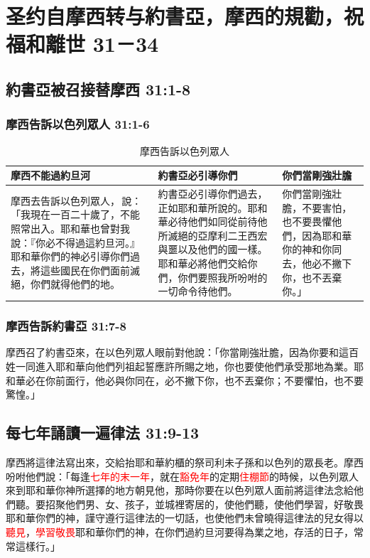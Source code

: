 \section{圣约自摩西转与約書亞，摩西的規勸，祝福和離世 31－34 }
\subsection{約書亞被召接替摩西 31:1-8 }
\subsubsection{摩西告訴以色列眾人 31:1-6}
\begin{table}[H]
\begin{center}
\begin{tabular}{ p{}|p{}|p{}} \toprule
摩西不能過約旦河&約書亞必引導你們&你們當剛強壯膽\\\hline
摩西去告訴以色列眾人， 說：「我現在一百二十歲了，不能照常出入。耶和華也曾對我說：『你必不得過這約旦河。』耶和華你們的神必引導你們過去，將這些國民在你們面前滅絕，你們就得他們的地。 
&約書亞必引導你們過去，正如耶和華所說的。耶和華必待他們如同從前待他所滅絕的亞摩利二王西宏與噩以及他們的國一樣。耶和華必將他們交給你們，你們要照我所吩咐的一切命令待他們。
&
你們當剛強壯膽，不要害怕，也不要畏懼他們，因為耶和華你的神和你同去，他必不撇下你，也不丟棄你。」 \\\hline
\end{tabular}
\end{center}
\caption{摩西告訴以色列眾人}
\end{table}


\subsubsection{摩西告訴約書亞 31:7-8}
摩西召了約書亞來，在以色列眾人眼前對他說：「你當剛強壯膽，因為你要和這百姓一同進入耶和華向他們列祖起誓應許所賜之地，你也要使他們承受那地為業。耶和華必在你前面行，他必與你同在，必不撇下你，也不丟棄你；不要懼怕，也不要驚惶。」



\subsection{每七年誦讀一遍律法 31:9-13}
摩西將這律法寫出來，交給抬耶和華約櫃的祭司利未子孫和以色列的眾長老。摩西吩咐他們說：「每逢\textcolor{red}{七年的末一年}，就在\textcolor{red}{豁免年}的定期\textcolor{red}{住棚節}的時候，以色列眾人來到耶和華你神所選擇的地方朝見他，那時你要在以色列眾人面前將這律法念給他們聽。要招聚他們男、女、孩子，並城裡寄居的，使他們聽，使他們學習，好敬畏耶和華你們的神，謹守遵行這律法的一切話，也使他們未曾曉得這律法的兒女得以\textcolor{red}{聽見}，\textcolor{red}{學習敬畏}耶和華你們的神，在你們過約旦河要得為業之地，存活的日子，常常這樣行。」


